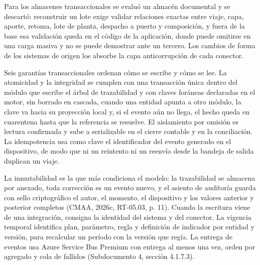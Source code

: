 \documentclass[subdoc]{../../comun/overfore}
\begin{document}
Para los almacenes transaccionales se evaluó un almacén documental y se descartó: reconstruir un lote exige validar relaciones exactas entre viaje, capa, aporte, retoma, lote de planta, despacho a puerto y composición, y fuera de la base esa validación queda en el código de la aplicación, donde puede omitirse en una carga masiva y no se puede demostrar ante un tercero. Los cambios de forma de los sistemas de origen los absorbe la capa anticorrupción de cada conector.

Seis garantías transaccionales ordenan cómo se escribe y cómo se lee. La atomicidad y la integridad se cumplen con una transacción única dentro del módulo que escribe el árbol de trazabilidad y con claves foráneas declaradas en el motor, sin borrado en cascada, cuando una entidad apunta a otro módulo, la clave va hacia su proyección local y, si el evento aún no llega, el hecho queda en cuarentena hasta que la referencia se resuelve. El aislamiento por omisión es lectura confirmada y sube a serializable en el cierre contable y en la conciliación. La idempotencia usa como clave el identificador del evento generado en el dispositivo, de modo que ni un reintento ni un reenvío desde la bandeja de salida duplican un viaje.

La inmutabilidad es la que más condiciona el modelo: la trazabilidad se almacena por anexado, toda corrección es un evento nuevo, y el asiento de auditoría guarda con sello criptográfico el autor, el momento, el dispositivo y los valores anterior y posterior completos (CMAA, 2026c, RT-05.03, p. 11). Cuando la escritura viene de una integración, consigna la identidad del sistema y del conector. La vigencia temporal identifica plan, parámetro, regla y definición de indicador por entidad y versión, para recalcular un período con la versión que regía. La entrega de eventos usa Azure Service Bus Premium con entrega al menos una vez, orden por agregado y cola de fallidos (Subdocumento 4, sección 4.1.7.3).
\end{document}
